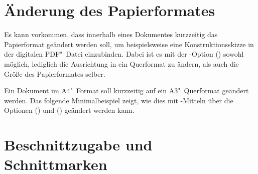 \section{%
  Änderung des Papierformates%
}

Es kann vorkommen, dass innerhalb eines Dokumentes kurzzeitig das Papierformat 
geändert werden soll, um beispielsweise eine Konstruktionsskizze in der 
digitalen PDF"~Datei einzubinden. Dabei ist es mit der \KOMAScript-Option 
() sowohl möglich, lediglich die 
Ausrichtung in ein Querformat zu ändern, als auch die Größe des Papierformates 
selber.
%
\begin{Example}
Ein Dokument im A4"~Format soll kurzzeitig auf ein A3"~Querformat geändert 
werden. Das folgende Minimalbeispiel zeigt, wie dies mit \KOMAScript-Mitteln 
über die Optionen () und 
() geändert werden kann.
\end{Example}



\section{%
  Beschnittzugabe und Schnittmarken%
  \label{sec:tips:crop}%
}

